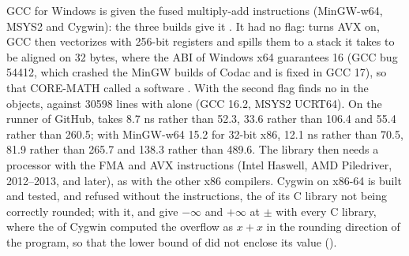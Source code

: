 \documentclass[12pt,a4paper,twoside,openright]{book}
\begin{document}
\medskip
GCC for Windows is given the fused multiply-add instructions (MinGW-w64,
MSYS2 and Cygwin): the three builds give it .\newinvfive{} It had no flag: 
turns AVX on, GCC then vectorizes with 256-bit registers and spills them to a
stack it takes to be aligned on 32 bytes, where the ABI of Windows x64
guarantees 16 (GCC bug 54412, which crashed the MinGW builds of Codac and is
fixed in GCC 17), so that CORE-MATH called a software . With the
second flag  finds no  in the objects, against
30598 lines with  alone (GCC 16.2, MSYS2 UCRT64). On the
runner of GitHub,  takes 8.7 ns rather than 52.3,
 33.6 rather than 106.4 and  55.4 rather than
260.5; with MinGW-w64 15.2 for 32-bit x86, 12.1 ns rather than 70.5, 81.9
rather than 265.7 and 138.3 rather than 489.6. The library then needs a
processor with the FMA and AVX instructions (Intel Haswell, AMD Piledriver,
2012--2013, and later), as with the other x86 compilers. Cygwin on x86-64 is
built and tested, and refused without the instructions, the  of
its C library not being correctly rounded; with it, 
and  give $-\infty$ and $+\infty$ at $\pm$
with every C library, where the  of Cygwin computed the
overflow as $x + x$ in the rounding direction of the program, so that the
lower bound of  did not enclose its value
().
\end{document}
